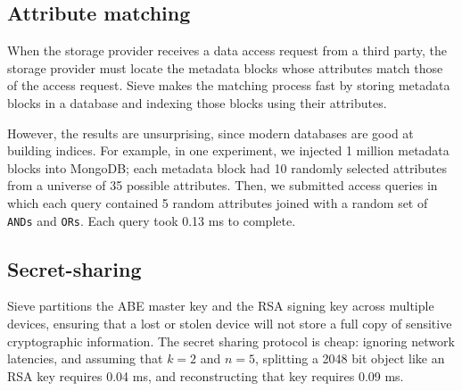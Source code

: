 \subsection{Attribute matching} 
When the storage
provider receives a data access request from a
third party, the storage provider must locate
the metadata blocks whose attributes match those
of the access request. Sieve makes the matching
process fast by storing metadata blocks in a
database and indexing those blocks using their
attributes.

However, the results
are unsurprising, since modern databases are good
at building indices. For example, in one experiment,
we injected 1 million metadata blocks into MongoDB;
each metadata block had 10 randomly selected attributes
from a universe of 35 possible attributes. Then, we
submitted access queries in which each query contained
5 random attributes joined with a random set of
\texttt{ANDs} and \texttt{ORs}. Each query took 0.13 ms
to complete.

\subsection{Secret-sharing} Sieve partitions the
ABE master key and the RSA signing key across
multiple devices, ensuring that a lost or stolen
device will not store a full copy of sensitive
cryptographic information. The secret sharing
protocol is cheap: ignoring network latencies,
and assuming that $k=2$ and $n=5$,
splitting a 2048 bit object like an RSA key
requires 0.04 ms, and reconstructing that key
requires 0.09 ms.
